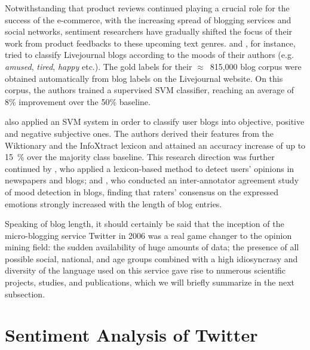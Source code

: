 
Notwithstanding that product reviews continued playing a crucial role
for the success of the e-commerce, with the increasing spread of
blogging services and social networks, sentiment researchers have
gradually shifted the focus of their work from product feedbacks to
these upcoming text genres.  \citet{Mishne:05} and \citet{Mishne:07},
for instance, tried to classify Livejournal blogs according to the
moods of their authors (e.g.  \emph{amused}, \emph{tired},
\emph{happy} etc.).  The gold labels for their $\approx$~815,000 blog
corpus were obtained automatically from blog labels on the Livejournal
website.  On this corpus, the authors trained a supervised SVM
classifier, reaching an average of 8\% improvement over the 50\%
baseline.

\citet{Chesley:06} also applied an SVM system in order to classify
user blogs into objective, positive and negative subjective ones.  The
authors derived their features from the Wiktionary and the InfoXtract
lexicon \citep{Srihari:03} and attained an accuracy increase of up to
15~\% over the majority class baseline.  This research direction was
further continued by \citet{Godbole:07}, who applied a lexicon-based
method to detect users' opinions in newspapers and blogs; and
\citet{Gill:08}, who conducted an inter-annotator agreement study of
mood detection in blogs, finding that raters' consensus on the
expressed emotions strongly increased with the length of blog entries.

Speaking of blog length, it should certainly be said that the
inception of the micro-blogging service Twitter in 2006 was a real
game changer to the opinion mining field: the sudden availability of
huge amounts of data; the presence of all possible social, national,
and age groups combined with a high idiosyncrasy and diversity of the
language used on this service gave rise to numerous scientific
projects, studies, and publications, which we will briefly summarize
in the next subsection.

\section{Sentiment Analysis of Twitter}\label{snt:subsec:intro:saot}

